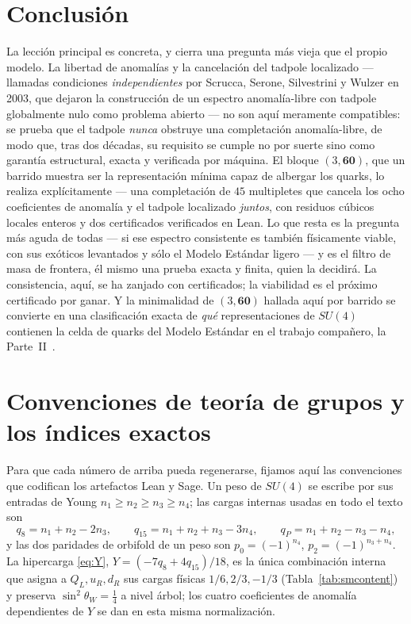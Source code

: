 \documentclass[11pt,a4paper]{article}
\begin{document}
\section{Conclusi\'on}\label{sec:conclusion}
La lecci\'on principal es concreta, y cierra una pregunta m\'as vieja que el propio modelo. La
libertad de anomal\'ias y la cancelaci\'on del tadpole localizado --- llamadas condiciones
\emph{independientes} por Scrucca, Serone, Silvestrini y Wulzer en 2003, que dejaron la
construcci\'on de un espectro anomal\'ia-libre con tadpole globalmente nulo como problema abierto
--- no son aqu\'i meramente compatibles: se prueba que el tadpole \emph{nunca} obstruye una
completaci\'on anomal\'ia-libre, de modo que, tras dos d\'ecadas, su requisito se cumple no por
suerte sino como garant\'ia estructural, exacta y verificada por m\'aquina. El bloque
$(3,\mathbf{60})$, que un barrido muestra ser la representaci\'on m\'inima capaz de albergar los
quarks, lo realiza expl\'icitamente --- una completaci\'on de $45$ multipletes que cancela los
ocho coeficientes de anomal\'ia y el tadpole localizado \emph{juntos}, con residuos c\'ubicos
locales enteros y dos certificados verificados en Lean. Lo que resta es la pregunta m\'as aguda de
todas --- si ese espectro consistente es tambi\'en f\'isicamente viable, con sus ex\'oticos
levantados y s\'olo el Modelo Est\'andar ligero --- y es el filtro de masa de frontera, \'el
mismo una prueba exacta y finita, quien la decidir\'a. La consistencia, aqu\'i, se ha zanjado con
certificados; la viabilidad es el pr\'oximo certificado por ganar. Y la minimalidad de
$(3,\mathbf{60})$ hallada aqu\'i por barrido se convierte en una clasificaci\'on exacta de
\emph{qu\'e} representaciones de $SU(4)$ contienen la celda de quarks del Modelo Est\'andar en
el trabajo compa\~nero, la Parte~II~\cite{PartII}.

\appendix
\section{Convenciones de teor\'ia de grupos y los \'indices exactos}\label{app:conventions}
Para que cada n\'umero de arriba pueda regenerarse, fijamos aqu\'i las convenciones que codifican
los artefactos Lean y Sage. Un peso de $SU(4)$ se escribe por sus entradas de Young
$n_1\ge n_2\ge n_3\ge n_4$; las cargas internas usadas en todo el texto son
\begin{equation}
q_8=n_1+n_2-2n_3,\qquad q_{15}=n_1+n_2+n_3-3n_4,\qquad q_P=n_1+n_2-n_3-n_4,
\end{equation}
y las dos paridades de orbifold de un peso son $p_0=(-1)^{n_4}$, $p_2=(-1)^{n_3+n_4}$. La
hipercarga \eqref{eq:Y}, $Y=(-7q_8+4q_{15})/18$, es la \'unica combinaci\'on interna que asigna a
$Q_L,u_R,d_R$ sus cargas f\'isicas $1/6,2/3,-1/3$ (Tabla~\ref{tab:smcontent}) y preserva
$\sin^2\theta_W=\tfrac14$ a nivel \'arbol; los cuatro coeficientes de anomal\'ia dependientes de
$Y$ se dan en esta misma normalizaci\'on.
\end{document}
